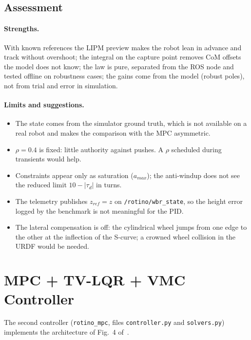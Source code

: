 \documentclass[11pt,a4paper]{article}
\begin{document}
\subsection{Assessment}

\paragraph{Strengths.}  With known references the LIPM preview makes the robot lean in advance
and track without overshoot; the integral on the capture point removes CoM offsets the model
does not know; the law is pure, separated from the ROS node and tested offline on robustness
cases; the gains come from the model (robust poles), not from trial and error in simulation.

\paragraph{Limits and suggestions.}
\begin{itemize}[leftmargin=*]
    \item The state comes from the simulator ground truth, which is not available on a real
          robot and makes the comparison with the MPC asymmetric.
    \item $\rho = 0.4$ is fixed: little authority against pushes.  A $\rho$ scheduled during
          transients would help.
    \item Constraints appear only as saturation ($a_{max}$); the anti-windup does not see the
          reduced limit $10 - |\tau_d|$ in turns.
    \item The telemetry publishes $z_{ref} = z$ on \texttt{/rotino/wbr\_state}, so the height error
          logged by the benchmark is not meaningful for the PID.
    \item The lateral compensation is off: the cylindrical wheel jumps from one edge to the other
          at the inflection of the S-curve; a crowned wheel collision in the URDF would be needed.
\end{itemize}


\section{MPC + TV-LQR + VMC Controller}
\label{sec:lqr_mpc}

The second controller (\texttt{rotino\_mpc}, files \texttt{controller.py} and \texttt{solvers.py})
implements the architecture of Fig.~4 of~\cite{cui2022}.
\end{document}
